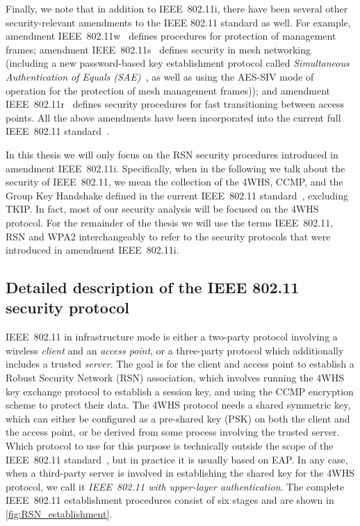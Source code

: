 Finally, we note that in addition to IEEE~802.11i,
there have been several other security-relevant amendments to the IEEE 802.11 standard as well.
For example,
amendment IEEE~802.11w~\cite{IEEE:2009:802.11w} defines procedures for protection of management frames;
amendment IEEE~802.11s~\cite{IEEE:2011:802.11s} defines security in mesh networking 
(including a new password-based key establishment protocol called \emph{Simultaneous Authentication of Equals (SAE)}~\cite{Harkins:2008:SAE},
as well as using the AES-SIV mode of operation \cite{IETF:RFC5297:AES-SIV} for the protection of mesh management frames));
and amendment IEEE~802.11r~\cite{IEEE:2008:802.11r} defines security procedures for fast transitioning between access points.    
All the above amendments have been incorporated into the current full IEEE~802.11 standard~\cite{IEEE:2012:802.11}. 


In this thesis we will only focus on the RSN security procedures introduced in amendment IEEE~802.11i.
Specifically, 
when in the following we talk about the security of IEEE~802.11,
we mean the collection of the 4WHS, CCMP, and the Group Key Handshake  defined in the current IEEE~802.11 standard~\cite{IEEE:2012:802.11},
excluding TKIP.
In fact, most of our security analysis will be focused on the 4WHS protocol.
For the remainder of the thesis we will use the terms IEEE~802.11, RSN and WPA2 interchangeably to refer to the security protocols that were introduced in amendment IEEE~802.11i.  



\subsection{Detailed description of the IEEE 802.11 security protocol}\label{sec:description:EAP_&_802.11:802.11:security_protocol}

IEEE~802.11 in infrastructure mode is either a two-party protocol involving a wireless \emph{client} and an \emph{access point},
or a three-party protocol which additionally includes a trusted \emph{server}.
The goal is for the client and access point to establish a Robust Security Network (RSN) association,
which involves running the 4WHS key exchange protocol to establish a session key,
and using the CCMP encryption scheme to protect their data.
The 4WHS protocol needs a shared symmetric key,
which can either be configured as a pre-shared key (PSK) on both the client and the access point,
or  be derived from some process involving the trusted server.
Which protocol to use for this purpose is technically outside the scope of the IEEE~802.11 standard~\cite{IEEE:2012:802.11},
but in practice it is usually based on EAP.
In any case,
when a third-party server is involved in establishing the shared key for the 4WHS protocol,
we call it \emph{IEEE~802.11 with upper-layer authentication}.
The complete IEEE~802.11 establishment procedures consist of six stages and are shown in \cref{fig:RSN_establishment}. 




